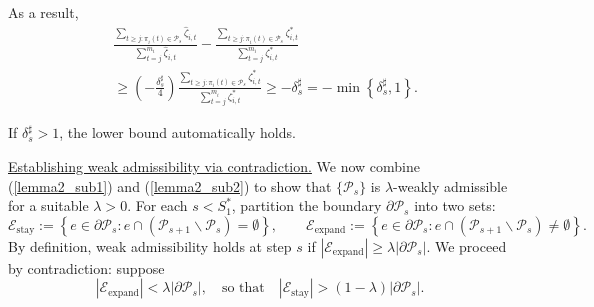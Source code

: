 \documentclass[
  12pt]{article}
\begin{document}
\noindent As a result, 
\begin{align}
& \frac{\sum_{t \geq j: \pi_i(t) \in \mathcal{P}_{s}} \widehat{\zeta}_{i,t}}{\sum_{t=j}^{m_i} \widehat{\zeta}_{i,t}}-\frac{\sum_{t \geq j: \pi_i(t) \in \mathcal{P}_{s}} \zeta^*_{i,t}}{\sum_{t=j}^{m_i} \zeta^*_{i,t}} \nonumber\\
& \geq\left(-\frac{\delta^\sharp_s}{4} \right)\frac{\sum_{t \geq j: \pi_i(t) \in \mathcal{P}_{s}} \zeta^*_{i,t}}{\sum_{t=j}^{m_i} \zeta^*_{i,t}} \geq-\delta^\sharp_s=-\min \left\{\delta^\sharp_s, 1\right\}. \label{lemma2_sub2}
\end{align}


\noindent If $\delta^\sharp_s>1$, the lower bound automatically holds.

\underline{Establishing weak admissibility via contradiction.} We now combine (\ref{lemma2_sub1}) and (\ref{lemma2_sub2}) to show that $\{\mathcal{P}_s\}$ is $\lambda$-weakly admissible for a suitable $\lambda>0$. For each $s < S_1^*$, partition the boundary $\partial \mathcal{P}_s$ into two sets:
$$\mathcal{E}_{\operatorname{stay}} := \left\{e \in \partial \mathcal{P}_s : e \cap\left(\mathcal{P}_{s+1} \backslash \mathcal{P}_s\right)=\emptyset\right\}, \quad\quad \mathcal{E}_{\operatorname{expand}} := \left\{e \in \partial \mathcal{P}_s : e \cap\left(\mathcal{P}_{s+1} \backslash \mathcal{P}_s\right) \neq \emptyset\right\}.$$
By definition, weak admissibility holds at step $s$ if $|\mathcal{E}_{\operatorname{expand}}| \geq \lambda |\partial \mathcal{P}_s|$. We proceed by contradiction: suppose
\begin{equation}\label{not_admissible}
|\mathcal{E}_{\operatorname{expand}}| < \lambda |\partial \mathcal{P}_s|, \quad\text{so that}\quad |\mathcal{E}_{\operatorname{stay}}| > (1-\lambda)|\partial \mathcal{P}_s|.
\end{equation}
\end{document}

